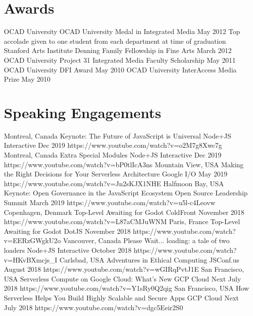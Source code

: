 \documentclass[10pt,a4paper,sans]{moderncv}   %
\begin{document}
 \section{Awards}
 \cventry
   {}{OCAD University}
   {OCAD University Medal in Integrated Media}
   {May 2012}{}
   {Top accolade given to one student from each department at time of graduation}
 \cventry
   {}{Stanford Arts Institute}
   {Denning Family Fellowship in Fine Arts}
   {March 2012}{}{}
 \cventry
   {}{OCAD University}
   {Project 31 Integrated Media Faculty Scholarship}
   {May 2011}{}{}
 \cventry
   {}{OCAD University}
   {DFI Award}
   {May 2010}{}{}
 \cventry
   {}{OCAD University}
   {InterAccess Media Prize}
   {May 2010}{}{}

\section{Speaking Engagements}
\cventry
   {Montreal, Canada}
   {Keynote: The Future of JavaScript is Universal}
   {Node+JS Interactive}
   {Dec 2019}{}
   {https://www.youtube.com/watch?v=o2M7g8Xwc7g}
\cventry
   {Montreal, Canada}
   {Extra Special Modules}
   {Node+JS Interactive}
   {Dec 2019}{}
   {https://www.youtube.com/watch?v=bP0tlIcA3ns}
\cventry
   {Mountain View, USA}
   {Making the Right Decisions for Your Serverless Architecture}
   {Google I/O}
   {May 2019}{}
   {https://www.youtube.com/watch?v=Jn2sKJX1NHE}
\cventry
   {Halfmoon Bay, USA}
   {Keynote: Open Governance in the JavaScript Ecosystem}
   {Open Source Leadership Summit}
   {March 2019}{}
   {https://www.youtube.com/watch?v=u5l-c4Leovw}
\cventry
   {Copenhagen, Denmark}
   {Top-Level Awaiting for Godot}
   {ColdFront}
   {November 2018}{}
   {https://www.youtube.com/watch?v=L87aCMJuWNM}
\cventry
   {Paris, France}
   {Top-Level Awaiting for Godot}
   {DotJS}
   {November 2018}{}
   {https://www.youtube.com/watch?v=EERzGWgkU2o}
\cventry
   {Vancouver, Canada}
   {Please Wait... loading: a tale of two loaders}
   {Node+JS Interactive}
   {October 2018}{}
   {https://www.youtube.com/watch?v=HKvBXmcjs\_I}
 \cventry
   {Carlsbad, USA}
   {Adventures in Ethical Computing}
   {JSConf.us}
   {August 2018}{}
   {https://www.youtube.com/watch?v=wGIRqPvtJ1E}
 \cventry
   {San Francisco, USA}
   {Serverless Compute on Google Cloud: What's New}
   {GCP Cloud Next}
   {July 2018}{}
   {https://www.youtube.com/watch?v=Y1sRy0Q2qig}
\cventry
   {San Francisco, USA}
   {How Serverless Helps You Build Highly Scalable and Secure Apps}
   {GCP Cloud Next}
   {July 2018}{}
   {https://www.youtube.com/watch?v=dgc5Eeir2S0}
\end{document}
